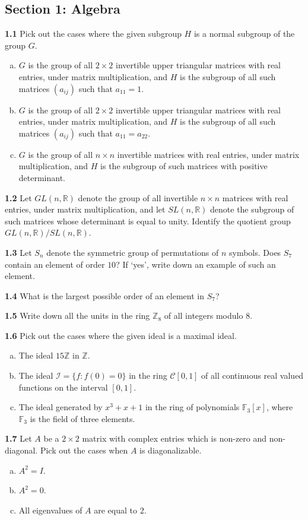 \documentclass[11pt,a4paper]{article}
\newcommand{\Z}{\mathbb{Z}}
\newcommand{\R}{\mathbb{R}}
\newcommand{\F}{\mathbb{F}}
\newcommand{\examsec}[1]{%
  \subsection*{#1}
  \vspace{-2pt}
}
\newcommand{\qitem}[1]{\par\medskip\noindent\textbf{#1}\hspace{0.5em}}
\begin{document}
\examsec{Section 1: Algebra}

\qitem{1.1} Pick out the cases where the given subgroup $H$ is a normal subgroup of the group $G$.
\begin{enumerate}[(a)]
  \item $G$ is the group of all $2 \times 2$ invertible upper triangular matrices with real entries, under matrix multiplication, and $H$ is the subgroup of all such matrices $(a_{ij})$ such that $a_{11} = 1$.
  \item $G$ is the group of all $2 \times 2$ invertible upper triangular matrices with real entries, under matrix multiplication, and $H$ is the subgroup of all such matrices $(a_{ij})$ such that $a_{11} = a_{22}$.
  \item $G$ is the group of all $n \times n$ invertible matrices with real entries, under matrix multiplication, and $H$ is the subgroup of such matrices with positive determinant.
\end{enumerate}

\qitem{1.2} Let $GL(n, \R)$ denote the group of all invertible $n \times n$ matrices with real entries, under matrix multiplication, and let $SL(n, \R)$ denote the subgroup of such matrices whose determinant is equal to unity. Identify the quotient group $GL(n, \R)/SL(n, \R)$.

\qitem{1.3} Let $S_n$ denote the symmetric group of permutations of $n$ symbols. Does $S_7$ contain an element of order $10$? If `yes', write down an example of such an element.

\qitem{1.4} What is the largest possible order of an element in $S_7$?

\qitem{1.5} Write down all the units in the ring $\Z_8$ of all integers modulo $8$.

\qitem{1.6} Pick out the cases where the given ideal is a maximal ideal.
\begin{enumerate}[(a)]
  \item The ideal $15\Z$ in $\Z$.
  \item The ideal $\mathcal{I} = \{f : f(0) = 0\}$ in the ring $\mathcal{C}[0, 1]$ of all continuous real valued functions on the interval $[0, 1]$.
  \item The ideal generated by $x^3 + x + 1$ in the ring of polynomials $\F_3[x]$, where $\F_3$ is the field of three elements.
\end{enumerate}

\qitem{1.7} Let $A$ be a $2 \times 2$ matrix with complex entries which is non-zero and non-diagonal. Pick out the cases when $A$ is diagonalizable.
\begin{enumerate}[(a)]
  \item $A^2 = I$.
  \item $A^2 = 0$.
  \item All eigenvalues of $A$ are equal to $2$.
\end{enumerate}
\end{document}
